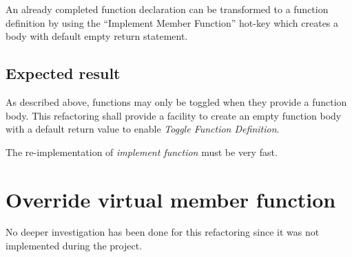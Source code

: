 An already completed function declaration can be transformed to a function
definition by using the ``Implement Member Function'' hot-key which creates a
body with default empty return statement.

\subsection{Expected result}
As described above, functions may only be toggled when they provide a function 
body. This refactoring shall provide a facility to create an empty function body 
with a default return value to enable \textit{Toggle Function Definition}.

The re-implementation of \textit{implement function} must be very fast. 

\section{Override virtual member function}

No deeper investigation has been done for this refactoring since it was not 
implemented during the project.

